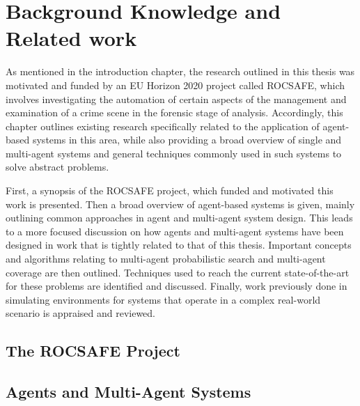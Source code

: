 

\chapter{Background Knowledge and Related work}\label{Background}

\workinprogress
As mentioned in the introduction chapter, the research outlined in this thesis was motivated and funded by an EU Horizon 2020 project called ROCSAFE, which involves investigating the automation of certain aspects of the management and examination of a crime scene in the forensic stage of analysis. Accordingly, this chapter outlines existing research specifically related to the application of agent-based systems in this area, while also providing a broad overview of single and multi-agent systems and general techniques commonly used in such systems to solve abstract problems. \par
First, a synopsis of the ROCSAFE project, which funded and motivated this work is presented. Then a broad overview of agent-based systems is given, mainly outlining common approaches in agent and multi-agent system design. This leads to a more focused discussion on how agents and multi-agent systems have been designed in work that is tightly related to that of this thesis. Important concepts and algorithms relating to multi-agent probabilistic search and multi-agent coverage are then outlined. Techniques used to reach the current state-of-the-art for these problems are identified and discussed. Finally, work previously done in simulating environments for systems that operate in a complex real-world scenario is appraised and reviewed.


\section{The ROCSAFE Project}



\section{Agents and Multi-Agent Systems}


